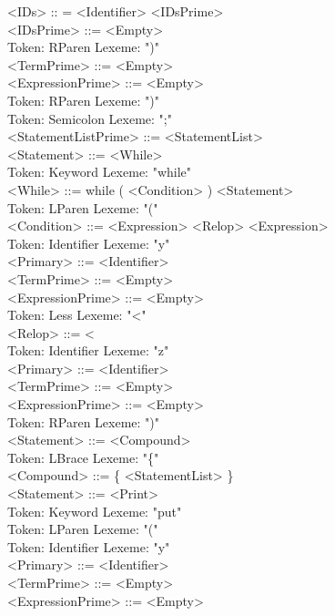 \documentclass[11pt]{article}
\begin{document}
        <IDs> :: = <Identifier> <IDsPrime> \\
        <IDsPrime> ::= <Empty> \\
Token: RParen    Lexeme: ")" \\
        <TermPrime> ::= <Empty> \\
        <ExpressionPrime> ::= <Empty> \\
Token: RParen    Lexeme: ")" \\
Token: Semicolon         Lexeme: ";" \\
        <StatementListPrime> ::= <StatementList> \\
        <Statement> ::= <While> \\
Token: Keyword   Lexeme: "while" \\
        <While> ::= while ( <Condition> ) <Statement> \\
Token: LParen    Lexeme: "(" \\
        <Condition> ::= <Expression> <Relop> <Expression> \\
Token: Identifier        Lexeme: "y" \\
        <Primary> ::= <Identifier> \\
        <TermPrime> ::= <Empty> \\
        <ExpressionPrime> ::= <Empty> \\
Token: Less      Lexeme: "<" \\
        <Relop> ::= < \\
Token: Identifier        Lexeme: "z" \\
        <Primary> ::= <Identifier> \\
        <TermPrime> ::= <Empty> \\
        <ExpressionPrime> ::= <Empty> \\
Token: RParen    Lexeme: ")" \\
        <Statement> ::= <Compound> \\
Token: LBrace    Lexeme: "\{" \\
        <Compound> ::= \{ <StatementList> \} \\
        <Statement> ::= <Print> \\
Token: Keyword   Lexeme: "put" \\
Token: LParen    Lexeme: "(" \\
Token: Identifier        Lexeme: "y" \\
        <Primary> ::= <Identifier> \\
        <TermPrime> ::= <Empty> \\
        <ExpressionPrime> ::= <Empty> \\
\end{document}
